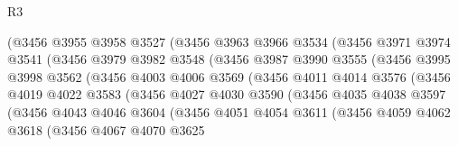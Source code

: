 \begin{lexlean}{R3}
\begin{coremodule}
                      (@3456
                        @3955
                        @3958
                        @3527
                        (@3456
                          @3963
                          @3966
                          @3534
                          (@3456
                            @3971
                            @3974
                            @3541
                            (@3456
                              @3979
                              @3982
                              @3548
                              (@3456
                                @3987
                                @3990
                                @3555
                                (@3456
                                  @3995
                                  @3998
                                  @3562
                                  (@3456
                                    @4003
                                    @4006
                                    @3569
                                    (@3456
                                      @4011
                                      @4014
                                      @3576
                                      (@3456
                                        @4019
                                        @4022
                                        @3583
                                        (@3456
                                          @4027
                                          @4030
                                          @3590
                                          (@3456
                                            @4035
                                            @4038
                                            @3597
                                            (@3456
                                              @4043
                                              @4046
                                              @3604
                                              (@3456
                                                @4051
                                                @4054
                                                @3611
                                                (@3456
                                                  @4059
                                                  @4062
                                                  @3618
                                                  (@3456
                                                    @4067
                                                    @4070
                                                    @3625

\end{coremodule}
\end{lexlean}
